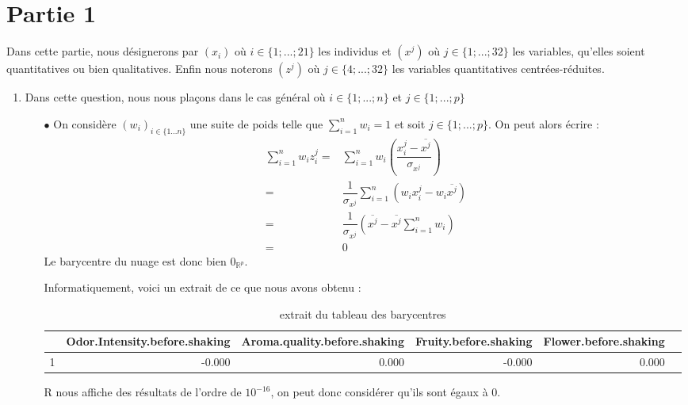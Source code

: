 \documentclass{article}
\begin{document}
\section{Partie 1}
Dans cette partie, nous désignerons par $(x_{i})$ où $i\in\{1;...;21\}$ les individus et $(x^{j})$ où $j\in\{1;...;32\}$ les variables, qu'elles soient quantitatives ou bien qualitatives. Enfin nous noterons $(z^{j})$ où $j\in\{4;...;32\}$ les variables quantitatives centrées-réduites. 
\begin{enumerate}
    \item Dans cette question, nous nous plaçons dans le cas général où $i\in\{1;...;n\}$ et $j\in\{1;...;p\}$
    \begin{itemize}
        \item[$\bullet$] On considère $(w_{i})_{i\in\{1...n\}}$ une suite de poids telle que $\displaystyle\sum_{i=1}^{n} w_i=1$ et soit $j\in\{1;...;p\}$. On peut alors écrire : 
        \begin{align*}
            \sum_{i=1}^{n} w_i z_i^j = & \sum_{i=1}^{n} w_i \left(\dfrac{x_i^j-\overline{x^j}}{\sigma_{x^j}}\right)\\
            =& \dfrac{1}{\sigma_{x^j}}\sum_{i=1}^{n}\left(w_i x_{i}^j-w_i \overline{x^j}\right) \\
            =&\dfrac{1}{\sigma_{x^j}} \left(\overline{x^j}-\overline{x^j}\sum_{i=1}^{n} w_i\right)\\
            =& 0
        \end{align*}
    Le barycentre du nuage est donc bien $0_{\mathbb{R}^{p}}$.
    
    Informatiquement, voici un extrait de ce que nous avons obtenu : 
    
    \begin{table}[ht]
\centering
\begin{tabular}{rrrrrr}
  \hline
 & Odor.Intensity.before.shaking & Aroma.quality.before.shaking & Fruity.before.shaking & Flower.before.shaking \\ 
  \hline
1 & -0.000 & 0.000 & -0.000 & 0.000 \\ 
   \hline
\end{tabular}
\caption{extrait du tableau des barycentres} 
\end{table}
    
R nous affiche des résultats de l'ordre de $10^{-16}$, on peut donc considérer qu'ils sont égaux à $0$.


\end{itemize}
\end{enumerate}
\end{document}
